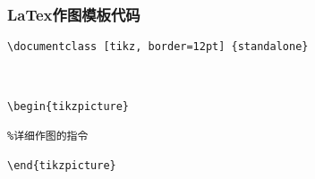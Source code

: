 \begin{frame}[fragile]
\frametitle{LaTex作图模板代码}

\begin{lstlisting}
\documentclass [tikz, border=12pt] {standalone}



\begin{tikzpicture}

%详细作图的指令

\end{tikzpicture}


\end{lstlisting}

\end{frame}
